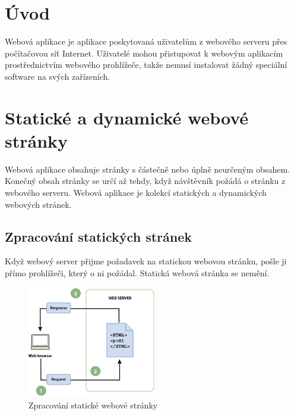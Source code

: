 \documentclass[12pt, a4paper,
twoside,        %
openright
]{report}
\begin{document}
\section{Úvod}
\label{sec:uvodwebovaaplikace}
Webová aplikace je aplikace poskytovaná uživatelům z webového serveru přes počítačovou síť Internet. Uživatelé mohou přistupovat k webovým aplikacím prostřednictvím webového prohlížeče, takže nemusí instalovat žádný speciální software na svých zařízeních.

\section{Statické a dynamické webové stránky}
\label{sec:statickeadynamickewebovestranky}
Webová aplikace obsahuje stránky s částečně nebo úplně neurčeným obsahem. Konečný obsah stránky se určí až tehdy, když návštěvník požádá o stránku z webového serveru. Webová aplikace je kolekcí statických a dynamických webových stránek.

\subsection{Zpracování statických stránek}
Když webový server přijme požadavek na statickou webovou stránku, pošle ji přímo prohlížeči, který o ni požádal. Statická webová stránka se nemění.
	\begin{figure}[h!]
		\centering
		\includegraphics[width=0.5\textwidth]{image/staticke.png}
		\caption{Zpracování statické webové stránky}
		\label{fig:statickastranka}
	\end{figure}
\end{document}
